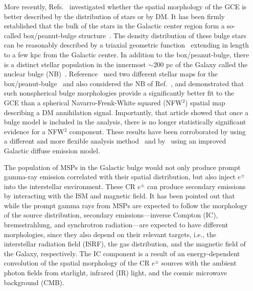 \documentclass[doublespace,nopageskip]{VTthesis} %
\begin{document}
More recently, Refs.~\cite{2018NatAs...2..387M,2018NatAs...2..819B,2019JCAP...09..042M} investigated whether the spatial morphology of the GCE is better described by the distribution of stars or by DM. It has been firmly established that the bulk of the stars in the Galactic center region form a so-called box/peanut-bulge structure~\cite{1995ApJ...445..716D,1998ApJ...492..495F,2000MNRAS.313..392L,2010ApJ...721L..28N,2013MNRAS.435.1874W}. The density distribution of these bulge stars can be reasonably described by a triaxial geometric function~\cite{1998ApJ...492..495F,2010ApJ...721L..28N,2013MNRAS.435.1874W} extending in length to a few kpc from the Galactic center. In addition to the box/peanut-bulge, there is a distinct stellar population in the innermost $\sim$200 pc of the Galaxy called the nuclear bulge (NB)~\cite{2013ApJ...769L..28N}. Reference~\cite{2018NatAs...2..387M} used two different stellar maps for the box/peanut-bulge~\cite{1998ApJ...492..495F,2016AJ....152...14N} and also considered the NB of Ref.~\cite{2013ApJ...769L..28N}, and demonstrated that such nonspherical bulge morphologies provide a significantly better fit to the GCE than a spherical Navarro-Frenk-White squared (NFW$^2$) spatial map describing a DM annihilation signal. Importantly, that article showed that once a bulge model is included in the analysis, there is no longer statistically significant evidence for a NFW$^2$ component. These results have been corroborated by \citet{2018NatAs...2..819B} using a different and more flexible analysis method~\cite{2017JCAP...08..022S} and by~\citet{2019JCAP...09..042M} using an improved Galactic diffuse emission model.

The population of MSPs in the Galactic bulge would not only produce prompt gamma-ray emission correlated with their spatial distribution, but also inject $e^\pm$ into the interstellar environment. These CR $e^\pm$ can produce secondary emissions by interacting with the ISM and magnetic field. It has been pointed out that while the prompt gamma rays from MSPs are expected to follow the morphology of the source distribution, secondary emissions---inverse Compton (IC), bremsstrahlung, and synchrotron radiation---are expected to have different morphologies, since they also depend on their relevant targets, i.e., the interstellar radiation field (ISRF), the gas distribution, and the magnetic field of the Galaxy, respectively. The IC component is a result of an energy-dependent convolution of the spatial morphology of the CR $e^\pm$ sources with the ambient photon fields from starlight, infrared (IR) light, and the cosmic microwave background (CMB).
\end{document}

